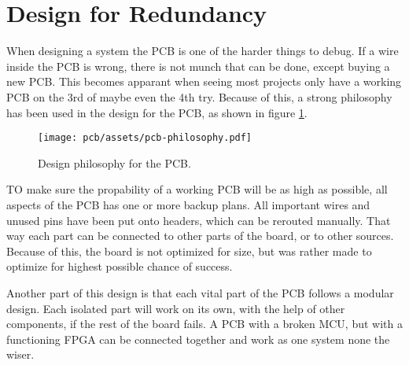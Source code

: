 \section{Design for Redundancy}

When designing a system the PCB is one of the harder things to debug.
If a wire inside the PCB is wrong, there is not munch that can be done, except buying a new PCB.
This becomes apparant when seeing most projects only have a working PCB on the 3rd of maybe even the 4th try. 
Because of this, a strong philosophy has been used in the design for the PCB, as shown in figure \ref{fig:pcb_philosophy}.

\begin{figure}[H]
    \centering
        \texttt{[image: pcb/assets/pcb-philosophy.pdf]}
    \caption{Design philosophy for the PCB.}
    \label{fig:pcb_philosophy}
\end{figure}

TO make sure the propability of a working PCB will be as high as possible, all aspects of the PCB has one or more backup plans.
All important wires and unused pins have been put onto headers, which can be rerouted manually.
That way each part can be connected to other parts of the board, or to other sources.
Because of this, the board is not optimized for size, but was rather made to optimize for highest possible chance of success.

Another part of this design is that each vital part of the PCB follows a modular design.
Each isolated part will work on its own, with the help of other components, if the rest of the board fails.
A PCB with a broken MCU, but with a functioning FPGA can be connected together and work as one system none the wiser.
